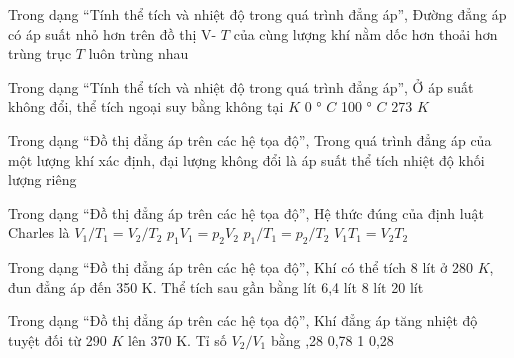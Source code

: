 \begin{ex}
Trong dạng “Tính thể tích và nhiệt độ trong quá trình đẳng áp”, Đường đẳng áp có áp suất nhỏ hơn trên đồ thị V- $T$ của cùng lượng khí nằm
\choice
{\True dốc hơn}
{thoải hơn}
{trùng trục $T$}
{luôn trùng nhau}
\end{ex}

\begin{ex}
Trong dạng “Tính thể tích và nhiệt độ trong quá trình đẳng áp”, Ở áp suất không đổi, thể tích ngoại suy bằng không tại
\choice
{ $K$}
{0 ° $C$}
{100 ° $C$}
{273 $K$}
\end{ex}

\begin{ex}
Trong dạng “Đồ thị đẳng áp trên các hệ tọa độ”, Trong quá trình đẳng áp của một lượng khí xác định, đại lượng không đổi là
\choice
{\True áp suất}
{thể tích}
{nhiệt độ}
{khối lượng riêng}
\end{ex}

\begin{ex}
Trong dạng “Đồ thị đẳng áp trên các hệ tọa độ”, Hệ thức đúng của định luật Charles là
\choice
{\True $V_1/T_1=V_2/T_2$}
{$p_1V_1=p_2V_2$}
{$p_1/T_1=p_2/T_2$}
{$V_1T_1=V_2T_2$}
\end{ex}

\begin{ex}
Trong dạng “Đồ thị đẳng áp trên các hệ tọa độ”, Khí có thể tích 8 lít ở 280 $K$, đun đẳng áp đến 350 K. Thể tích sau gần bằng
\choice
{ lít}
{6,4 lít}
{8 lít}
{20 lít}
\end{ex}

\begin{ex}
Trong dạng “Đồ thị đẳng áp trên các hệ tọa độ”, Khí đẳng áp tăng nhiệt độ tuyệt đối từ 290 $K$ lên 370 K. Tỉ số $V_2/V_1$ bằng
\choice
{,28}
{0,78}
{1}
{0,28}
\end{ex}


